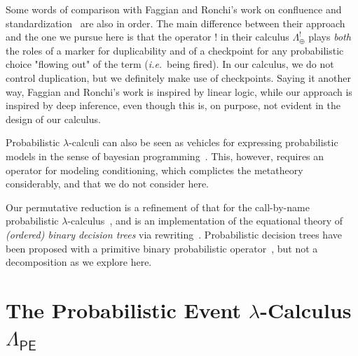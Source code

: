 \documentclass[runningheads,orivec]{llncs}
\theoremstyle{definition}
\theoremstyle{plain}
\newcommand{\ie}{\textit{i.e.}}
\newcommand\PEL{\Lambda_{\textsf{PE}}}
\newcommand\+[1][{}]{\kern1pt{\smallbin\oplus}_{#1}\kern1pt}
\newcommand\1{\bullet}
\newcommand\0{\circ}
\begin{document}
Some words of comparison with Faggian and Ronchi's work on confluence and standardization~\cite{FaggianRonchi19} are also in order. The main difference between their approach and the one we pursue here is that the operator $!$ in their calculus $\Lambda_\oplus^!$ plays \emph{both} the roles of a marker for duplicability and of a checkpoint for any probabilistic choice "flowing out" of the term (\ie\ being fired). In our calculus, we do not control duplication, but we definitely make use of checkpoints. Saying it another way, Faggian and Ronchi's work is inspired by linear logic, while our approach is inspired by deep inference, even though this is, on purpose, not evident in the design of our calculus. 

Probabilistic $\lambda$-calculi can also be seen as vehicles for expressing probabilistic models in the sense of bayesian programming~\cite{Ramsey-Pfeffer-2002,BDLGS16}. This, however, requires an operator for modeling conditioning, which complictes the metatheory considerably, and that we do not consider here.

Our permutative reduction is a refinement of that for the call-by-name probabilistic $\lambda$-calculus~\cite{Leventis19}, and is an implementation of the equational theory of \emph{(ordered) binary decision trees} via rewriting~\cite{Zantema-Pol-2001}. Probabilistic decision trees have been proposed with a primitive binary probabilistic operator~\cite{Manber-Tompa-1982}, but not a decomposition as we explore here.



\section{\texorpdfstring{The Probabilistic Event $\lambda$-Calculus $\PEL$}{The Probabilistic Event Lambda-Calculus PEL}}
\label{sec:PEL}
\end{document}
